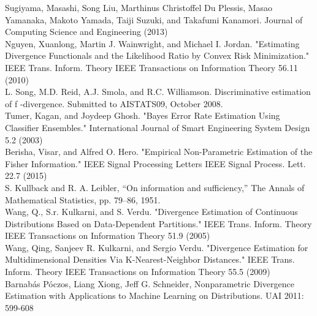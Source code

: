 \documentclass{article}
\begin{document}
	\noindent [21] Sugiyama, Masashi, Song Liu, Marthinus Christoffel Du Plessis, Masao Yamanaka, Makoto 
	\indent Yamada, Taiji Suzuki, and Takafumi Kanamori. Journal of Computing Science and Engineering 
	 (2013)
	\\ [0.5ex]
	
	\noindent [22] Nguyen, Xuanlong, Martin J. Wainwright, and Michael I. Jordan. "Estimating Divergence
	\indent Functionals and the Likelihood Ratio by Convex Risk Minimization." IEEE Trans. Inform. 
	\indent Theory IEEE Transactions on Information Theory 56.11 (2010)
	\\ [0.5ex]

	\noindent [23] L. Song, M.D. Reid, A.J. Smola, and R.C. Williamson. Discriminative estimation of f -divergence. 
	\indent Submitted to AISTATS09, October 2008.
	\\ [0.5ex]
	
	\noindent [24] Tumer, Kagan, and Joydeep Ghosh. "Bayes Error Rate Estimation Using Classifier Ensembles." 
	\indent International Journal of Smart Engineering System Design 5.2 (2003)
	\\ [0.5ex]
	
	\noindent [25] Berisha, Visar, and Alfred O. Hero. "Empirical Non-Parametric Estimation of the Fisher 
	\indent Information." IEEE Signal Processing Letters IEEE Signal Process. Lett. 22.7 (2015)
	\\ [0.5ex]
	
	\noindent [26] S. Kullback and R. A. Leibler, “On information and sufficiency,” The	Annals of Mathematical 
	\indent Statistics, pp. 79–86, 1951.
	\\ [0.5ex]
	
	\noindent [27] Wang, Q., S.r. Kulkarni, and S. Verdu. "Divergence Estimation of Continuous Distributions 
	\indent Based on Data-Dependent Partitions." IEEE Trans. Inform. Theory IEEE Transactions on 
	\indent Information Theory 51.9 (2005)
	\\ [0.5ex]
	
	\noindent [28] Wang, Qing, Sanjeev R. Kulkarni, and Sergio Verdu. "Divergence Estimation for Multidimensional 
	\indent Densities Via K-Nearest-Neighbor Distances." IEEE Trans. Inform. Theory IEEE Transactions 
	\indent on Information Theory 55.5 (2009)
	\\ [0.5ex]

	\noindent [29] Barnabás Póczos, Liang Xiong, Jeff G. Schneider, Nonparametric Divergence Estimation with 
	\indent Applications to Machine Learning on Distributions. UAI 2011: 599-608
	\\ [0.5ex]
	
\end{document}

